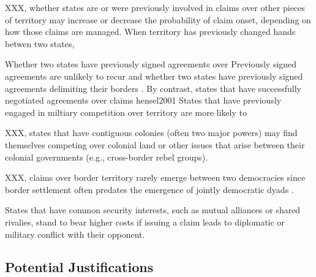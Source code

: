 
XXX, whether states are or were previously involved in claims over other pieces of territory may increase or decrease the probability of claim onset, depending on how those claims are managed.
When territory has previously changed hands betwen two states,

Whether two states have previously signed agreements over 
Previously signed agreements are unlikely to recur
and whether two states have previously signed agreements delimiting their borders \citep{owsiak2012, huth2009}. %
By contrast, states that have successfully negotiated agreements over claims 
hensel2001
States that have previously engaged in miltiary competition over territory are more likely to 


XXX, states that have contiguous colonies (often two major powers) may find themselves competing over colonial land or other issues that arise between their colonial governments (e.g., cross-border rebel groups).

XXX, claims over border territory rarely emerge between two democracies since border settlement often predates the emergence of jointly democratic dyads \citep{gibler2012, gibler2018, owsiak2016d}. 


States that have common security interests, such as mutual alliances or shared rivalies, stand to bear higher costs if issuing a claim leads to diplomatic or military conflict with their opponent.



\subsection{Potential Justifications}

